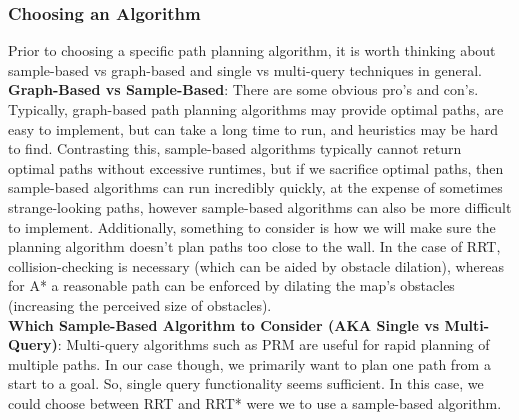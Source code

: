 \documentclass{article}
\begin{document}
\subsubsection{Choosing an Algorithm}

Prior to choosing a specific path planning algorithm, it is worth thinking about sample-based vs graph-based and single vs multi-query techniques in general. \\

\textbf{Graph-Based vs Sample-Based}:
 There are some obvious pro's and con's. Typically, graph-based path planning algorithms may provide optimal paths, are easy to implement, but can take a long time to run, and heuristics may be hard to find. Contrasting this, sample-based algorithms typically cannot return optimal paths without excessive runtimes, but if we sacrifice optimal paths, then sample-based algorithms can run incredibly quickly, at the expense of sometimes strange-looking paths, however sample-based algorithms can also be more difficult to implement. Additionally, something to consider is how we will make sure the planning algorithm doesn't plan paths too close to the wall. In the case of RRT, collision-checking is necessary (which can be aided by obstacle dilation), whereas for A* a reasonable path can be enforced by dilating the map's obstacles (increasing the perceived size of obstacles). \\ 

 \textbf{Which Sample-Based Algorithm to Consider (AKA Single vs Multi-Query)}: Multi-query algorithms such as PRM are useful for rapid planning of multiple paths. In our case though, we primarily want to plan one path from a start to a goal. So, single query functionality seems sufficient. In this case, we could choose between RRT and RRT* were we to use a sample-based algorithm. \\ 
\end{document}
